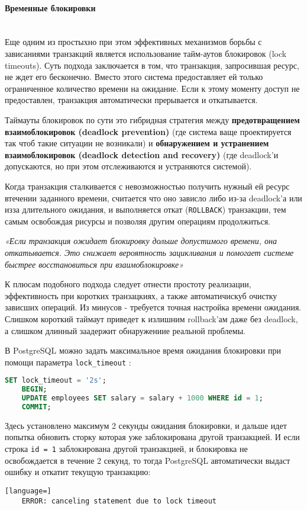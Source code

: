 \paragraph{Временные блокировки} ~\\

Еще одним из простыхно при этом эффективных механизмов борьбы с зависаниями транзакций является использование тайм-аутов блокировок (lock timeouts). Суть подхода заключается в том, что транзакция, запросившая ресурс, не ждет его бесконечно. Вместо этого система предоставляет ей только ограниченное количество времени на ожидание. Если к этому моменту доступ не предоставлен, транзакция автоматически прерывается и откатывается. \autocite[ch.18]{Silberschatz}

Таймауты блокировок по сути это гибридная стратегия между \textbf{предотвращением взаимоблокировок (deadlock prevention)} (где система ваще проектируется так чтоб такие ситуации не возникали) и \textbf{обнаружением и устранением взаимоблокировок (deadlock detection and recovery)} (где deadlock'и допускаются, но при этом отслеживаются и устраняются системой).

Когда транзакция сталкивается с невозможностью получить нужный ей ресурс втечении заданного времени, считается что оно зависло либо из-за deadlock'а или изза длительного ожидания, и выполняется откат (\texttt{ROLLBACK}) транзакции, тем самым освобождая рисурсы и позволяя другим операциям продолжиться.

\begin{grayquote}
    \textit{«Если транзакция ожидает блокировку дольше допустимого времени, она откатывается. Это снижает вероятность зацикливания и помогает системе быстрее восстановиться при взаимоблокировке»} \autocite[ch.18]{Silberschatz}
\end{grayquote}

К плюсам подобного подхода следует отнести простоту реализации, эффективность при коротких транзацкиях, а также автоматичискуб очистку зависших операций.
Из минусов - требуется точная настройка времени ожидания. Слишком короткий таймаут приведет к излишним rollback'ам даже без deadlock, а слишком длинный заадержит обнаружениие реальной проблемы. \autocite[ch.22]{ElmasriNavathe}

В PostgreSQL можно задать максимальное время ожидания блокировки при помощи параметра \texttt{lock\_timeout} \autocite[§19.11]{PostgreSQLdocc19}:
\begin{lstlisting}[language=SQL]
    SET lock_timeout = '2s';
    BEGIN;
    UPDATE employees SET salary = salary + 1000 WHERE id = 1;
    COMMIT;
\end{lstlisting}
Здесь установлено максимум 2 секунды ожидания блокировки, и дальше идет попытка обновить сторку которая уже заблокирована другой транзакцией. И если строка \texttt{id = 1} заблокирована другой транзакцией, и блокировка не освобождается в течение 2 секунд, то тогда PostgreSQL автоматически выдаст ошибку и откатит текущую транзакцию:
\begin{lstlisting}[language=]
    ERROR: canceling statement due to lock timeout
\end{lstlisting}

